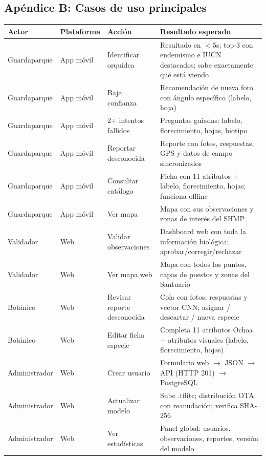 \documentclass[12pt, a4paper]{article}
\begin{document}
\subsection{Ap\'endice B: Casos de uso principales}

\begin{longtable}{|p{2.3cm}|p{2.5cm}|p{2.8cm}|p{5.7cm}|}
\hline
\textbf{Actor} & \textbf{Plataforma} & \textbf{Acci\'on} & \textbf{Resultado esperado} \\
\hline
\endhead
Guardaparque & App m\'ovil & Identificar orqu\'idea & Resultado en $<$5s; top-3 con endemismo e IUCN destacados; sabe exactamente qu\'e est\'a viendo \\
\hline
Guardaparque & App m\'ovil & Baja confianza & Recomendaci\'on de nueva foto con \'angulo espec\'ifico (labelo, hoja) \\
\hline
Guardaparque & App m\'ovil & 2+ intentos fallidos & Preguntas guiadas: labelo, florecimiento, hojas, biotipo \\
\hline
Guardaparque & App m\'ovil & Reportar desconocida & Reporte con fotos, respuestas, GPS y datos de campo sincronizados \\
\hline
Guardaparque & App m\'ovil & Consultar cat\'alogo & Ficha con 11 atributos + labelo, florecimiento, hojas; funciona offline \\
\hline
Guardaparque & App m\'ovil & Ver mapa & Mapa con sus observaciones y zonas de inter\'es del SHMP \\
\hline
Validador & Web & Validar observaciones & Dashboard web con toda la informaci\'on biol\'ogica; aprobar/corregir/rechazar \\
\hline
Validador & Web & Ver mapa web & Mapa con todos los puntos, capas de puestos y zonas del Santuario \\
\hline
Bot\'anico & Web & Revisar reporte desconocida & Cola con fotos, respuestas y vector CNN; asignar / descartar / nueva especie \\
\hline
Bot\'anico & Web & Editar ficha especie & Completa 11 atributos Ochoa + atributos visuales (labelo, florecimiento, hojas) \\
\hline
Administrador & Web & Crear usuario & Formulario web $\rightarrow$ JSON $\rightarrow$ API (HTTP 201) $\rightarrow$ PostgreSQL \\
\hline
Administrador & Web & Actualizar modelo & Sube .tflite; distribuci\'on OTA con reanudaci\'on; verifica SHA-256 \\
\hline
Administrador & Web & Ver estad\'isticas & Panel global: usuarios, observaciones, reportes, versi\'on del modelo \\
\hline
\end{longtable}
\end{document}
